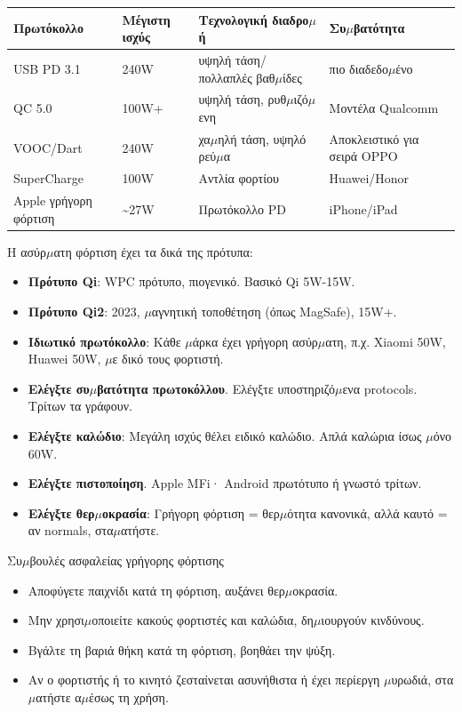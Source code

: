 
\begin{center}
\begin{tabularx}{\linewidth}{|X|X|X|X|}
\hline
\textbf{Πρωτόκολλο} & \textbf{Μέγιστη ισχύς} & \textbf{Τεχνολογική διαδρο$\mu$ή} & \textbf{Συ$\mu$βατότητα} \tabularnewline
\hline
USB PD 3.1 & 240W & υψηλή τάση/πολλαπλές βαθ$\mu$ίδες & πιο διαδεδο$\mu$ένο \tabularnewline
QC 5.0 & 100W+ & υψηλή τάση, ρυθ$\mu$ιζό$\mu$ενη & Μοντέλα Qualcomm \tabularnewline
VOOC/Dart & 240W & χα$\mu$ηλή τάση, υψηλό ρεύ$\mu$α & Αποκλειστικό για σειρά OPPO \tabularnewline
SuperCharge & 100W & Αντλία φορτίου & Huawei/Honor \tabularnewline
Apple γρήγορη φόρτιση & \textasciitilde{}27W & Πρωτόκολλο PD & iPhone/iPad \tabularnewline
\hline
\end{tabularx}
\end{center}


Η ασύρ$\mu$ατη φόρτιση έχει τα δικά της πρότυπα:

\begin{itemize}
  \item \textbf{Πρότυπο Qi}: WPC πρότυπο, πιογενικό. Βασικό Qi 5W-15W.
  \item \textbf{Πρότυπο Qi2}: 2023, $\mu$αγνητική τοποθέτηση (όπως MagSafe), 15W+.
  \item \textbf{Ιδιωτικό πρωτόκολλο}: Κάθε $\mu$άρκα έχει γρήγορη ασύρ$\mu$ατη, π.χ. Xiaomi 50W, Huawei 50W, $\mu$ε δικό τους φορτιστή.
\end{itemize}


\begin{itemize}
  \item \textbf{Ελέγξτε συ$\mu$βατότητα πρωτοκόλλου}. Ελέγξτε υποστηριζό$\mu$ενα protocols. Τρίτων τα γράφουν.
  \item \textbf{Ελέγξτε καλώδιο}: Μεγάλη ισχύς θέλει ειδικό καλώδιο. Απλά καλώρια ίσως $\mu$όνο 60W.
  \item \textbf{Ελέγξτε πιστοποίηση}. Apple MFi· Android πρωτότυπο ή γνωστό τρίτων.
  \item \textbf{Ελέγξτε θερ$\mu$οκρασία}: Γρήγορη φόρτιση = θερ$\mu$ότητα κανονικά, αλλά καυτό = αν normals, στα$\mu$ατήστε.
\end{itemize}

\begin{tcbwarn}{Συ$\mu$βουλές ασφαλείας γρήγορης φόρτισης}
\begin{itemize}
  \item Αποφύγετε παιχνίδι κατά τη φόρτιση, αυξάνει θερ$\mu$οκρασία.
  \item Μην χρησι$\mu$οποιείτε κακούς φορτιστές και καλώδια, δη$\mu$ιουργούν κινδύνους.
  \item Βγάλτε τη βαριά θήκη κατά τη φόρτιση, βοηθάει την ψύξη.
  \item Αν ο φορτιστής ή το κινητό ζεσταίνεται ασυνήθιστα ή έχει περίεργη $\mu$υρωδιά, στα$\mu$ατήστε α$\mu$έσως τη χρήση.
\end{itemize}

\end{tcbwarn}


